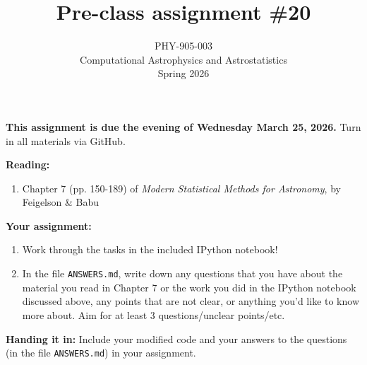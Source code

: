 \documentclass[10pt]{article}
\title{Pre-class assignment \#20}
\author{PHY-905-003\\Computational Astrophysics and
  Astrostatistics\\Spring 2026}
\date{} %
\begin{document}
 
\maketitle

\vspace{-10mm}

\noindent
\textbf{This assignment is due the evening of Wednesday March 25, 2026.}
 Turn in all materials via GitHub.

\vspace{5mm}

\noindent
\textbf{Reading:}

\begin{enumerate}

\item Chapter 7 (pp. 150-189) of \textit{Modern Statistical Methods
for Astronomy}, by Feigelson \& Babu

\end{enumerate}

\noindent
\textbf{Your assignment:}

\begin{enumerate}

\item Work through the tasks in the included IPython notebook!

\item In the file \texttt{ANSWERS.md}, write down any questions that
you have about the material you read in Chapter 7 or the work
you did in the IPython notebook discussed above, any points that are
not clear, or anything you'd like to know more about.  Aim for at
least 3 questions/unclear points/etc. 

\end{enumerate}

\noindent \textbf{Handing it in:} Include your modified code and
your answers to the questions (in the file \texttt{ANSWERS.md})
in your assignment.
\end{document}

